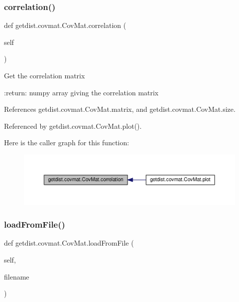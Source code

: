 \subsubsection{\texorpdfstring{correlation()}{correlation()}}
{\footnotesize\ttfamily def getdist.\+covmat.\+Cov\+Mat.\+correlation (\begin{DoxyParamCaption}\item[{}]{self }\end{DoxyParamCaption})}

\begin{DoxyVerb}Get the correlation matrix

:return: numpy array giving the correlation matrix
\end{DoxyVerb}
 

References getdist.\+covmat.\+Cov\+Mat.\+matrix, and getdist.\+covmat.\+Cov\+Mat.\+size.



Referenced by getdist.\+covmat.\+Cov\+Mat.\+plot().

Here is the caller graph for this function\+:
\nopagebreak
\begin{figure}[H]
\begin{center}
\leavevmode
\includegraphics[width=350pt]{classgetdist_1_1covmat_1_1CovMat_a17725849ae798508a7fa2847ecb06d8c_icgraph}
\end{center}
\end{figure}
\mbox{\label{classgetdist_1_1covmat_1_1CovMat_abfc622cd1affb70314b55774500ef495}} 
\subsubsection{\texorpdfstring{load\+From\+File()}{loadFromFile()}}
{\footnotesize\ttfamily def getdist.\+covmat.\+Cov\+Mat.\+load\+From\+File (\begin{DoxyParamCaption}\item[{}]{self,  }\item[{}]{filename }\end{DoxyParamCaption})}



